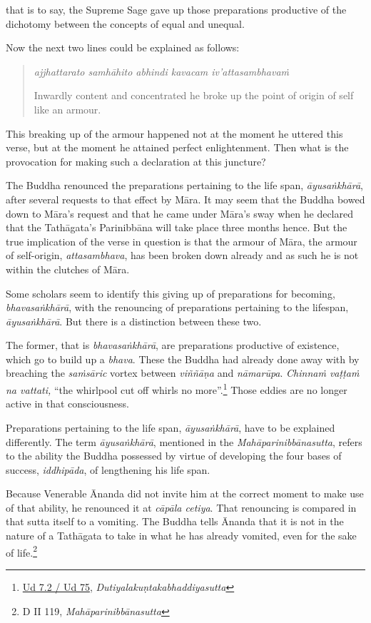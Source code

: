 that is to say, the Supreme Sage gave up those preparations productive of the dichotomy between the concepts of equal and unequal.

Now the next two lines could be explained as follows:

\begin{quote}
\emph{ajjhattarato samhāhito abhindi kavacam iv'attasambhavaṁ}

Inwardly content and concentrated he broke up the point of origin of self like an armour.
\end{quote}

This breaking up of the armour happened not at the moment he uttered this verse, but at the moment he attained perfect enlightenment. Then what is the provocation for making such a declaration at this juncture?

The Buddha renounced the preparations pertaining to the life span, \emph{āyusaṅkhārā}, after several requests to that effect by Māra. It may seem that the Buddha bowed down to Māra's request and that he came under Māra's sway when he declared that the Tathāgata's Parinibbāna will take place three months hence. But the true implication of the verse in question is that the armour of Māra, the armour of self-origin, \emph{attasambhava}, has been broken down already and as such he is not within the clutches of Māra.

Some scholars seem to identify this giving up of preparations for becoming, \emph{bhavasaṅkhārā}, with the renouncing of preparations pertaining to the lifespan, \emph{āyusaṅkhārā}. But there is a distinction between these two.

The former, that is \emph{bhavasaṅkhārā}, are preparations productive of existence, which go to build up a \emph{bhava}. These the Buddha had already done away with by breaching the \emph{saṁsāric} vortex between \emph{viññāṇa} and \emph{nāmarūpa}. \emph{Chinnaṁ vaṭṭaṁ na vattati,} ``the whirlpool cut off whirls no more''.\footnote{\href{https://suttacentral.net/ud7.2/pli/ms}{Ud 7.2 / Ud 75}, \emph{Dutiyalakuṇtakabhaddiyasutta}} Those eddies are no longer active in that consciousness.

Preparations pertaining to the life span, \emph{āyusaṅkhārā}, have to be explained differently. The term \emph{āyusaṅkhārā}, mentioned in the \emph{Mahāparinibbānasutta}, refers to the ability the Buddha possessed by virtue of developing the four bases of success, \emph{iddhipāda}, of lengthening his life span.

Because Venerable Ānanda did not invite him at the correct moment to make use of that ability, he renounced it at \emph{cāpāla cetiya}. That renouncing is compared in that sutta itself to a vomiting. The Buddha tells Ānanda that it is not in the nature of a Tathāgata to take in what he has already vomited, even for the sake of life.\footnote{D II 119, \emph{Mahāparinibbānasutta}}

